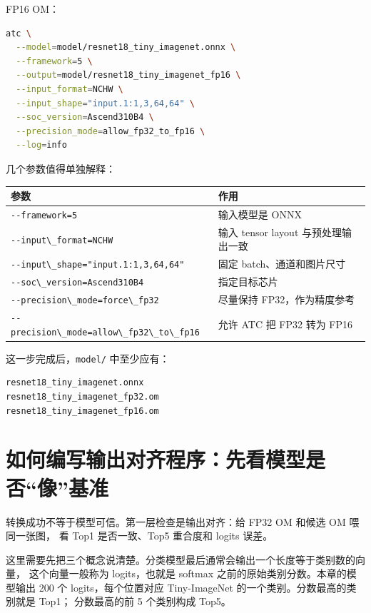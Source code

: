 FP16 OM：

\begin{lstlisting}[language=bash]
atc \
  --model=model/resnet18_tiny_imagenet.onnx \
  --framework=5 \
  --output=model/resnet18_tiny_imagenet_fp16 \
  --input_format=NCHW \
  --input_shape="input.1:1,3,64,64" \
  --soc_version=Ascend310B4 \
  --precision_mode=allow_fp32_to_fp16 \
  --log=info
\end{lstlisting}

几个参数值得单独解释：

\begin{longtable}[]{@{}ll@{}}
\toprule\noalign{}
参数 & 作用 \\
\midrule\noalign{}
\endhead
\bottomrule\noalign{}
\endlastfoot
\passthrough{\lstinline!--framework=5!} & 输入模型是 ONNX \\
\passthrough{\lstinline!--input\_format=NCHW!} & 输入 tensor layout
与预处理输出一致 \\
\passthrough{\lstinline!--input\_shape="input.1:1,3,64,64"!} & 固定
batch、通道和图片尺寸 \\
\passthrough{\lstinline!--soc\_version=Ascend310B4!} & 指定目标芯片 \\
\passthrough{\lstinline!--precision\_mode=force\_fp32!} & 尽量保持
FP32，作为精度参考 \\
\passthrough{\lstinline!--precision\_mode=allow\_fp32\_to\_fp16!} & 允许
ATC 把 FP32 转为 FP16 \\
\end{longtable}

这一步完成后，\passthrough{\lstinline!model/!} 中至少应有：

\begin{lstlisting}
resnet18_tiny_imagenet.onnx
resnet18_tiny_imagenet_fp32.om
resnet18_tiny_imagenet_fp16.om
\end{lstlisting}

\section{如何编写输出对齐程序：先看模型是否``像''基准}\label{src-book-chapter9-h7}

转换成功不等于模型可信。第一层检查是输出对齐：给 FP32 OM 和候选 OM
喂同一张图， 看 Top1 是否一致、Top5 重合度和 logits 误差。

这里需要先把三个概念说清楚。分类模型最后通常会输出一个长度等于类别数的向量，
这个向量一般称为 logits，也就是 softmax
之前的原始类别分数。本章的模型输出 200 个 logits，每个位置对应
Tiny-ImageNet 的一个类别。分数最高的类别就是 Top1； 分数最高的前 5
个类别构成 Top5。


